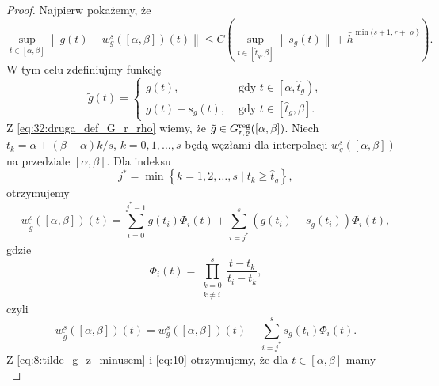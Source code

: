 \documentclass[oik, pdftex, man]{mgrwms}
\begin{document}
    \begin{proof}
        Najpierw pokażemy, że
        \begin{equation} \label{eq:7}
            \sup _{t \in[\alpha, \beta]}\left\|g(t)-w_{g}^{s}([\alpha, \beta])(t)\right\| \leq C\left(\sup _{t \in\left[\hat{t}_{g}, \beta\right]}\left\|s_{g}(t)\right\|+\bar{h}^{\min (s+1, r+\varrho\}}\right).
        \end{equation}
        W tym celu zdefiniujmy funkcję
        \begin{equation} \label{eq:8:tilde_g_z_minusem}
            \tilde{g}(t)= \begin{cases}
                g(t),            & \text { gdy } t \in\left[\alpha, \hat{t}_{g}\right), \\ 
                g(t)-s_{g}(t),   & \text { gdy } t \in\left[\hat{t}_{g}, \beta\right].
            \end{cases}
        \end{equation}
        Z \eqref{eq:32:druga_def_G_r_rho} wiemy, że $\tilde{g} \in G_{r, \varrho}^{\mathrm{reg}}([\alpha, \beta])$. Niech $t_{k}=\alpha+(\beta-\alpha) k / s$, $k=0,1, \ldots, s$ będą węzłami dla interpolacji $w_{g}^{s}([\alpha, \beta])$ na przedziale $[\alpha, \beta]$. Dla indeksu
        \begin{equation} \label{eq:9}
            j^{*}=\min \left\{k=1,2, \ldots, s \mid t_{k} \geq \hat{t}_{g}\right\},
        \end{equation}
        otrzymujemy
        \begin{equation} \label{eq:10}
            w_{\tilde{g}}^{s}([\alpha, \beta])(t)=\sum_{i=0}^{j^{*}-1} g\left(t_{i}\right) \Phi_{i}(t)+\sum_{i=j^{*}}^{s}\left(g\left(t_{i}\right)-s_{g}\left(t_{i}\right)\right) \Phi_{i}(t),
        \end{equation}
        gdzie
        \begin{equation*}
            \Phi_{i}(t)=\prod_{\substack{k=0 \\ k \neq i}}^{s} \frac{t-t_{k}}{t_{i}-t_{k}},
        \end{equation*}
        czyli
        \begin{equation*} \label{eq:11}
            w_{\tilde{g}}^{s}([\alpha, \beta])(t)=w_{g}^{s}([\alpha, \beta])(t)-\sum_{i=j^{*}}^{s} s_{g}\left(t_{i}\right) \Phi_{i}(t).
        \end{equation*}
        Z \eqref{eq:8:tilde_g_z_minusem} i \eqref{eq:10} otrzymujemy, że dla $t \in [\alpha, \beta]$ mamy
        \begin{equation*} \label{eq:12}

\end{equation*}
\end{proof}
\end{document}
